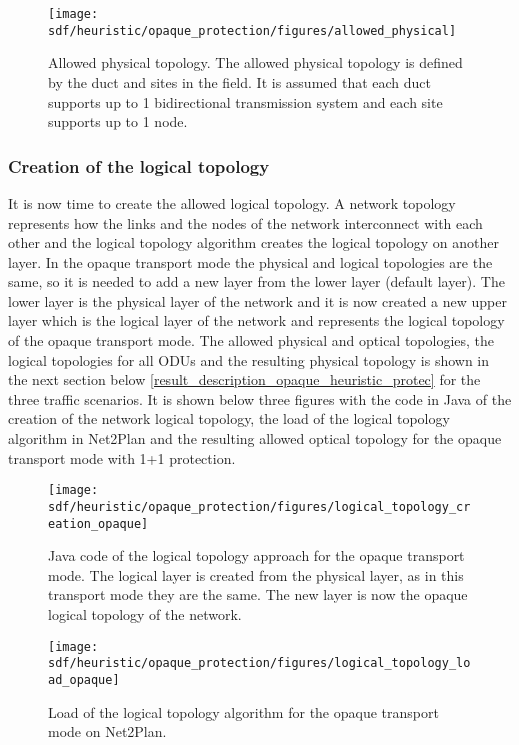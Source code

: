 \begin{figure}[H]
\centering
\texttt{[image: sdf/heuristic/opaque\_protection/figures/allowed\_physical]}
\caption{Allowed physical topology. The allowed physical topology is defined by the duct and sites in the field. It is assumed that each duct supports up to 1 bidirectional transmission system and each site supports up to 1 node.}
\label{allowed_physical_surv_ref_low_heuristic}
\end{figure}

\subsubsection{Creation of the logical topology}

\vspace{11pt}
It is now time to create the allowed logical topology. A network topology represents how the links and the nodes of the network interconnect with each other and the logical topology algorithm creates the logical topology on another layer. In the opaque transport mode the physical and logical topologies are the same, so it is needed to add a new layer from the lower layer (default layer). The lower layer is the physical layer of the network and it is now created a new upper layer which is the logical layer of the network and represents the logical topology of the opaque transport mode. The allowed physical and optical topologies, the logical topologies for all ODUs and the resulting physical topology is shown in the next section below \ref{result_description_opaque_heuristic_protec} for the three traffic scenarios. It is shown below three figures with the code in Java of the creation of the network logical topology, the load of the logical topology algorithm in Net2Plan and the resulting allowed optical topology for the opaque transport mode with 1+1 protection.

\begin{figure}[H]
\centering
\texttt{[image: sdf/heuristic/opaque\_protection/figures/logical\_topology\_creation\_opaque]}
\caption{Java code of the logical topology approach for the opaque transport mode. The logical layer is created from the physical layer, as in this transport mode they are the same. The new layer is now the opaque logical topology of the network.}
\label{logical_topology_creation_opaque}
\end{figure}

\begin{figure}[H]
\centering
\texttt{[image: sdf/heuristic/opaque\_protection/figures/logical\_topology\_load\_opaque]}
\caption{Load of the logical topology algorithm for the opaque transport mode on Net2Plan.}
\label{logical_topology_load_opaque}
\end{figure}

